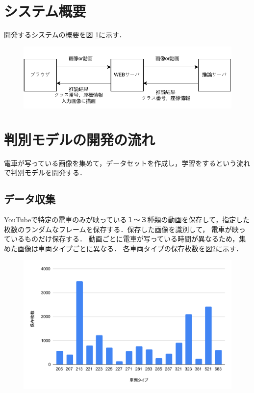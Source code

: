 \begin{multicols*}{2}
\section{システム概要}
開発するシステムの概要を図 \ref{abc}に示す．
\begin{figure} %
	\label{abc}
	\centering
	\includegraphics[width=\linewidth]{obj/system.pdf}
\end{figure}

\section{判別モデルの開発の流れ}
電車が写っている画像を集めて，データセットを作成し，学習をするという流れで判別モデルを開発する．

\subsection{データ収集}
	YouTubeで特定の電車のみが映っている１〜３種類の動画を保存して，指定した枚数のランダムなフレームを保存する．保存した画像を識別して，	電車が映っているものだけ保存する．
	動画ごとに電車が写っている時間が異なるため，集めた画像は車両タイプごとに異なる．
	各車両タイプの保存枚数を図\ref{fig:chart}に示す．
	
	\begin{figure}
		\centering
		\includegraphics[width=\linewidth]{obj/chart.pdf}
		\label{fig:chart}
	\end{figure}

\end{multicols*}
